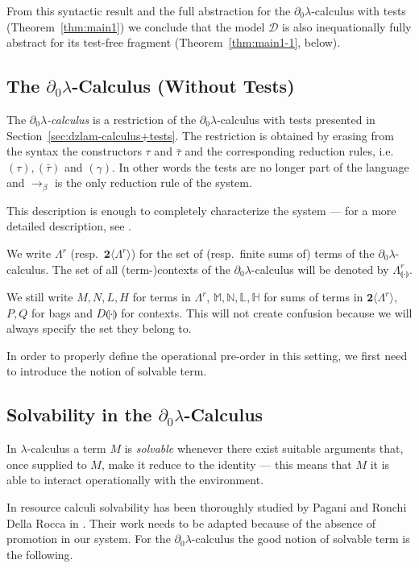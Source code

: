\documentclass{LMCS}
\newcommand{\bool}{\mathbf{2}}
\newcommand{\dzlam}{\ensuremath{\partial_0\lambda}}
\newcommand{\lam}{\ensuremath{\lambda}}
\renewcommand{\hole}[1]{\llparenthesis #1\rrparenthesis}
\newcommand{\Set}[1]{\Lambda^{#1}}
\newcommand{\sums}[1]{\bool\langle\Set{#1}\rangle}
\newcommand{\sM}{\mathbb{M}}
\newcommand{\sN}{\mathbb{N}}
\newcommand{\sL}{\mathbb{L}}
\newcommand{\sH}{\mathbb{H}}
\newcommand{\gt}{\ensuremath{\tau}}
\newcommand{\gto}{\ensuremath{\bar\tau}}
\newcommand{\cD}{\mathcal{D}}
\begin{document}
From this syntactic result and the full abstraction for the \dzlam-calculus with tests (Theorem~\ref{thm:main1})
we conclude that the model $\cD$ is also inequationally fully abstract for its test-free fragment (Theorem~\ref{thm:main1-1}, below).


\subsection{The $\dzlam$-Calculus (Without Tests)} 
The \emph{$\dzlam$-calculus} is a restriction of the $\dzlam$-calculus with tests presented in Section~\ref{sec:dzlam-calculus+tests}. 
The restriction is obtained by erasing from the syntax the constructors $\gt$ and $\gto$ and the corresponding reduction rules, i.e.\ $(\gt),(\gto)$ and $(\gamma)$.
In other words the tests are no longer part of the language and $\to_\beta$ is the only reduction rule of the system.

This description is enough to completely characterize the system --- for a more detailed description, see \cite{EhrhardR06bis,EhrhardR08}.

\begin{nota} We write $\Set{r}$ (resp.\ $\sums{r}$) for the set of (resp.\ finite sums of) terms of the $\dzlam$-calculus.
The set of all (term-)contexts of the $\dzlam$-calculus will be denoted by $\Set{r}_{\hole{\cdot}}$.
\end{nota}

We still write $M,N,L,H$ for terms in $\Set{r}$, $\sM,\sN,\sL,\sH$ for sums of terms in $\sums{r}$, $P,Q$ for bags
and $D\hole{\cdot}$ for contexts. 
This will not create confusion because we will always specify the set they belong to.

In order to properly define the operational pre-order in this setting, we first need to introduce the notion of solvable term.


\subsection{Solvability in the $\dzlam$-Calculus}
In \lam-calculus \cite{Bare} a term $M$ is \emph{solvable} whenever there exist suitable arguments that, once supplied to $M$, make it reduce to the identity ---
this means that $M$ it is able to interact operationally with the environment.

In resource calculi solvability has been thoroughly studied by Pagani and Ronchi Della Rocca in \cite{PaganiR11,PaganiR10}. 
 Their work needs to be adapted because of the absence of promotion in our system. For the \dzlam-calculus the good notion of solvable term is the following.
\end{document}
